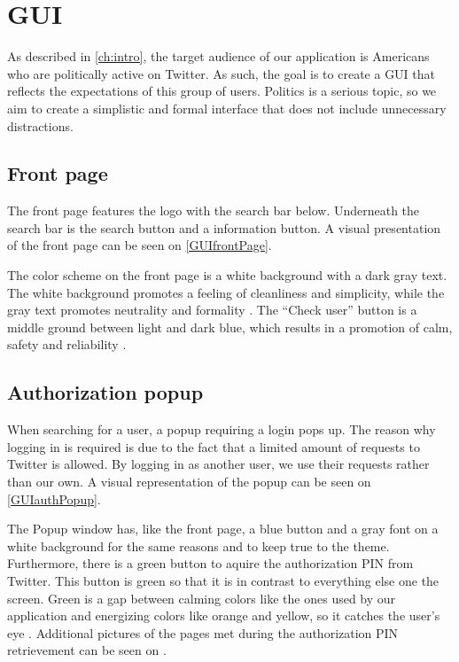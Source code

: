\chapter{GUI} \label{GUI}
As described in \autoref{ch:intro}, the target audience of our application is
Americans who are politically active on Twitter. As such, the goal is to create
a GUI that reflects the expectations of this group of users. Politics is a serious
topic, so we aim to create a simplistic and formal interface that does not
include unnecessary distractions.

\section{Front page}
The front page features the logo with the search bar below. Underneath the
search bar is the search button and a information button. A visual presentation
of the front page can be seen on \autoref{GUIfrontPage}.

{}

The color scheme on the front page is a white background with a dark gray text.
The white background promotes a feeling of cleanliness and simplicity, while the
gray text promotes neutrality and formality \citep[p. 63 \& 64]{WebUI}. 
The ``Check user'' button is a middle ground between light and dark blue, which
results in a promotion of calm, safety and reliability \citep[p. 61]{WebUI}.

\section{Authorization popup}

When searching for a user, a popup requiring a login pops up. The reason why
logging in is required is due to the fact that a limited amount of requests to
Twitter is allowed. By logging in as another user, we use their requests rather
than our own. A visual representation of the popup can be seen on
\autoref{GUIauthPopup}.


The Popup window has, like the front page, a blue button and a gray font on a
white background for the same reasons and to keep true to the theme.
Furthermore, there is a green button to aquire the authorization PIN from
Twitter. This button is green so that it is in contrast to everything else one
the screen. Green is a gap between calming colors like the ones used by our
application and energizing colors like orange and yellow, so it catches the
user's eye \citep[p. 60]{WebUI}. Additional pictures of the pages met during the
authorization PIN retrievement can be seen on .

